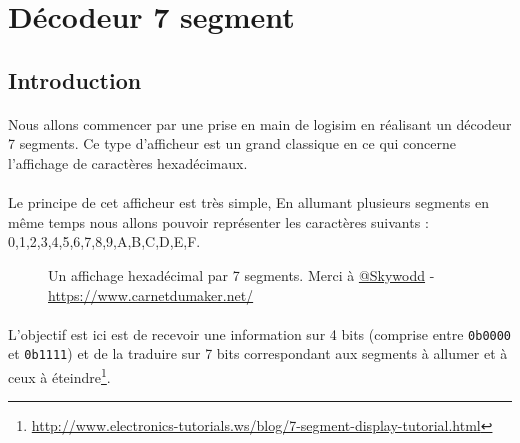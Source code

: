 \documentclass{article}
\begin{document}
    \section{Décodeur 7 segment}

    \subsection{Introduction}

    \paragraph{}
    Nous allons commencer par une prise en main de logisim en réalisant un décodeur 7 segments.
    Ce type d'afficheur est un grand classique en ce qui concerne l'affichage de caractères hexadécimaux.

    \paragraph{}
    Le principe de cet afficheur est très simple, En allumant plusieurs segments en même temps nous allons pouvoir représenter les caractères suivants :
    0,1,2,3,4,5,6,7,8,9,A,B,C,D,E,F.

    \begin{figure}[H]
        \caption{Un affichage hexadécimal par 7 segments. Merci à \href{https://twitter.com/skywodd}{@Skywodd} - \url{https://www.carnetdumaker.net/}}
    \end{figure}

    \paragraph{}
    L'objectif est ici est de recevoir une information sur 4 bits (comprise entre \texttt{0b0000} et \texttt{0b1111}) et de la traduire sur 7 bits correspondant aux segments à allumer et à ceux à éteindre\footnote{\url{http://www.electronics-tutorials.ws/blog/7-segment-display-tutorial.html}}.
\end{document}
